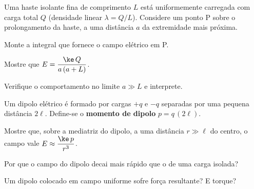 \blocodesafio
\begin{questao}[4]{}

Uma haste isolante fina de comprimento $L$ está uniformemente carregada com carga
total $Q$ (densidade linear $\lambda=Q/L$). Considere um ponto P sobre o
prolongamento da haste, a uma distância $a$ da extremidade mais próxima.
\begin{itensq}
\item Monte a integral que fornece o campo elétrico em P.
\item Mostre que $E=\dfrac{\ke\,Q}{a\,(a+L)}$.
\item Verifique o comportamento no limite $a \gg L$ e interprete.
\end{itensq}


\end{questao}
\begin{questao}[4]{}

Um dipolo elétrico é formado por cargas $+q$ e $-q$ separadas por uma pequena
distância $2\ell$. Define-se o \textbf{momento de dipolo} $p=q\,(2\ell)$.
\begin{itensq}
\item Mostre que, sobre a mediatriz do dipolo, a uma distância $r\gg\ell$ do
      centro, o campo vale $E\approx\dfrac{\ke\,p}{r^{3}}$.
\item Por que o campo do dipolo decai mais rápido que o de uma carga isolada?
\item Um dipolo colocado em campo uniforme sofre força resultante? E torque?
\end{itensq}


\end{questao}

